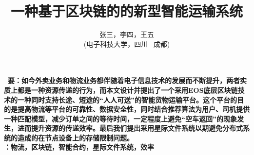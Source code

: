 \documentclass[UTF8]{ctexart}
\title{\textbf{一种基于区块链的的新型智能运输系统}}
\author{\sffamily 张三，李四，王五\\ \sffamily(电子科技大学，四川 \ 成都)}
\date{}
\begin{document}
  \maketitle
  \textbf{ \ 要：\heiti  \small 如今外卖业务和物流业务都伴随着电子信息技术的发展而不断提升，两者实质上都是一种资源传递的行为，而本文设计并提出了一个采用EOS底层区块链技术的一种同时支持长途、短途的“人人可送”的智能货物运输平台。这个平台的目的是提高物流等平台的可靠性、数据安全性，同时结合推荐算法为用户、司机提供一种匹配模型，减少订单之间的等待时间，一定程度上避免“空车返回”的现象发生，进而提升资源的传递效率。最后我们提出采用星际文件系统以期避免分布式系统的造成的在节点设备上的存储限制问题。}
  \\
  \indent \textbf{：\heiti  \small 物流，区块链，智能合约，星际文件系统，效率}
  \pagestyle{plain}	%
  \\
  \\
\end{document}
